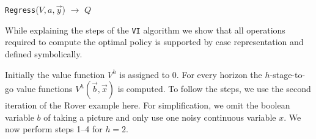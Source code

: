 \incmargin{.5em}
\linesnumbered
\begin{algorithm}[t!]
\vspace{-.5mm}
\dontprintsemicolon
{}


\caption{\footnotesize \texttt{Regress}($V,a,\vec{y}$) $\longrightarrow$ $Q$ \label{alg:regress}}
\vspace{-1mm}
\end{algorithm}
\decmargin{.5em}

While explaining the steps of the \texttt{VI} algorithm we show that all operations required to compute the optimal policy is supported by case representation and defined symbolically. 

Initially the value function $V^h$ is assigned to 0. For every horizon the $h$-stage-to-go value functions $V^h(\vec{b},\vec{x})$ is computed. To follow the steps, we use the second iteration of the Rover example here. For simplification, we omit the boolean variable $b$ of taking a picture and only use one noisy continuous variable $x$. We now perform steps 1--4 for $h=2$.

